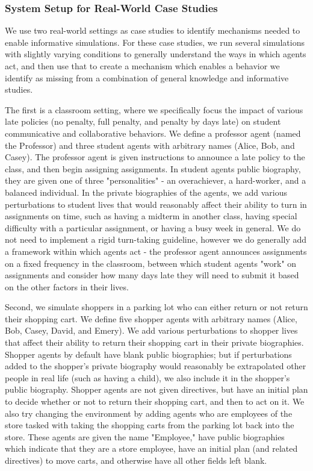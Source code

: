 \subsubsection{System Setup for Real-World Case Studies}

\color{red}We use two real-world settings as case studies to identify mechanisms needed to enable informative simulations. For these case studies, we run several simulations with slightly varying conditions to generally understand the ways in which agents act, and then use that to create a mechanism which enables a behavior we identify as missing from a combination of general knowledge and informative studies.

The first is a classroom setting, where we specifically focus the impact of various late policies (no penalty, full penalty, and penalty by days late) on student communicative and collaborative behaviors. We define a professor agent (named the Professor) and three student agents with arbitrary names (Alice, Bob, and Casey). The professor agent is given instructions to announce a late policy to the class, and then begin assigning assignments. In student agents public biography, they are given one of three "personalities" - an overachiever, a hard-worker, and a balanced individual. In the private biographies of the agents, we add various perturbations to student lives that would reasonably affect their ability to turn in assignments on time, such as having a midterm in another class, having special difficulty with a particular assignment, or having a busy week in general. We do not need to implement a rigid turn-taking guideline, however we do generally add a framework within which agents act - the professor agent announces assignments on a fixed frequency in the classroom, between which student agents "work" on assignments and consider how many days late they will need to submit it based on the other factors in their lives.

Second, we simulate shoppers in a parking lot who can either return or not return their shopping cart. We define five shopper agents with arbitrary names (Alice, Bob, Casey, David, and Emery). We add various perturbations to shopper lives that affect their ability to return their shopping cart \cite{scientificamerican2020shoppingcarts} in their private biographies. Shopper agents by default have blank public biographies; but if perturbations added to the shopper's private biography would reasonably be extrapolated other people in real life (such as having a child), we also include it in the shopper's public biography. Shopper agents are not given directives, but have an initial plan to decide whether or not to return their shopping cart, and then to act on it. We also try changing the environment by adding agents who are employees of the store tasked with taking the shopping carts from the parking lot back into the store. These agents are given the name "Employee," have public biographies which indicate that they are a store employee, have an initial plan (and related directives) to move carts, and otherwise have all other fields left blank.\color{black}

